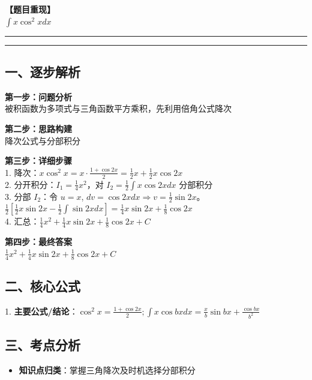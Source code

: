 ﻿\documentclass[12pt, a4paper]{ctexart}
\newcommand{\AnalysisSeparator}{
    \par\noindent\rule{\textwidth}{0.5pt}\vspace{0.2em}\hrule\vspace{0.5em}
}
\newenvironment{RedAnalysis}{
    \par
    \color{red} 
}{
    \par
    \color{black} 
}
\begin{document}
\textbf{【题目重现】} \\
$\int x \cos^2 x dx$

\AnalysisSeparator

\begin{RedAnalysis}

	\subsection*{一、逐步解析}

	\textbf{第一步：问题分析} \\
	被积函数为多项式与三角函数平方乘积，先利用倍角公式降次

	\textbf{第二步：思路构建} \\
	降次公式与分部积分

	\textbf{第三步：详细步骤} \\
	1. 降次：$x \cos^2 x = x \cdot \frac{1+\cos 2x}{2} = \frac{1}{2}x + \frac{1}{2}x\cos 2x$ \\ 
	2. 分开积分：$I_1 = \frac{1}{4}x^2$，对 $I_2 = \frac{1}{2} \int x\cos 2x dx$ 分部积分 \\ 
	3. 分部 $I_2$：令 $u=x$, $dv=\cos 2x dx \Rightarrow v=\frac{1}{2}\sin 2x$。\\ 
	$\frac{1}{2}[ \frac{1}{2}x\sin 2x - \frac{1}{2}\int\sin 2x dx ] = \frac{1}{4}x\sin 2x + \frac{1}{8}\cos 2x$ \\ 
	4. 汇总：$\frac{1}{4}x^2 + \frac{1}{4}x\sin 2x + \frac{1}{8}\cos 2x + C$

	\textbf{第四步：最终答案} \\
	$\frac{1}{4}x^2 + \frac{1}{4}x\sin 2x + \frac{1}{8}\cos 2x + C$

	\subsection*{二、核心公式}
	1. \textbf{主要公式/结论}：$\cos^2 x = \frac{1+\cos 2x}{2}; \int x \cos bx dx = \frac{x}{b}\sin bx + \frac{\cos bx}{b^2}$

	\subsection*{三、考点分析}
	\begin{itemize}
		\item \textbf{知识点归类}：掌握三角降次及时机选择分部积分
	\end{itemize}

\end{RedAnalysis}
\end{document}
